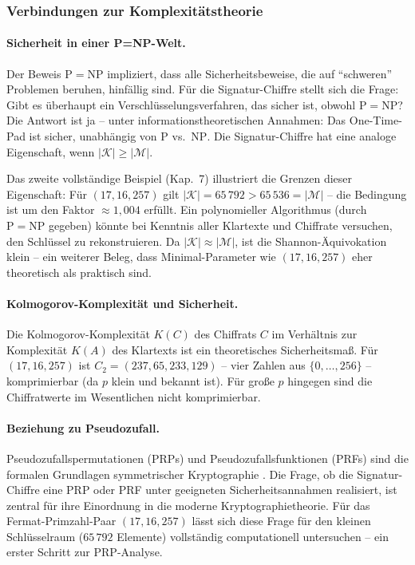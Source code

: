 ﻿\documentclass[a4paper,12pt]{scrreprt}
\theoremstyle{definition}
\begin{document}
\subsubsection{Verbindungen zur Komplexitätstheorie}

\paragraph{Sicherheit in einer P=NP-Welt.}
Der Beweis $\mathrm{P}=\mathrm{NP}$ \cite{Epp26a} impliziert, dass alle Sicherheitsbeweise, die auf ``schweren'' Problemen beruhen, hinfällig sind. Für die Signatur-Chiffre stellt sich die Frage: Gibt es überhaupt ein Verschlüsselungsverfahren, das sicher ist, obwohl $\mathrm{P}=\mathrm{NP}$? Die Antwort ist ja -- unter informationstheoretischen Annahmen: Das One-Time-Pad \cite{Ver26} ist sicher, unabhängig von $\mathrm{P}$ vs.\ $\mathrm{NP}$. Die Signatur-Chiffre hat eine analoge Eigenschaft, wenn $|\mathcal{K}| \geq |\mathcal{M}|$.

Das zweite vollständige Beispiel (Kap.~7) illustriert die Grenzen dieser Eigenschaft: Für $(17, 16, 257)$ gilt $|\mathcal{K}| = 65\,792 > 65\,536 = |\mathcal{M}|$ -- die Bedingung ist um den Faktor $\approx 1{,}004$ erfüllt. Ein polynomieller Algorithmus (durch $\mathrm{P}=\mathrm{NP}$ gegeben) könnte bei Kenntnis aller Klartexte und Chiffrate versuchen, den Schlüssel zu rekonstruieren. Da $|\mathcal{K}| \approx |\mathcal{M}|$, ist die Shannon-Äquivokation klein -- ein weiterer Beleg, dass Minimal-Parameter wie $(17, 16, 257)$ eher theoretisch als praktisch sind.

\paragraph{Kolmogorov-Komplexität und Sicherheit.}
Die Kolmogorov-Komplexität $K(C)$ des Chiffrats $C$ im Verhältnis zur Komplexität $K(A)$ des Klartexts ist ein theoretisches Sicherheitsmaß. Für $(17, 16, 257)$ ist $C_2 = (237, 65, 233, 129)$ -- vier Zahlen aus $\{0,\ldots,256\}$ -- komprimierbar (da $p$ klein und bekannt ist). Für große $p$ hingegen sind die Chiffratwerte im Wesentlichen nicht komprimierbar.

\paragraph{Beziehung zu Pseudozufall.}
Pseudozufallspermutationen (PRPs) und Pseudozufallsfunktionen (PRFs) sind die formalen Grundlagen symmetrischer Kryptographie \cite{GM84}. Die Frage, ob die Signatur-Chiffre eine PRP oder PRF unter geeigneten Sicherheitsannahmen realisiert, ist zentral für ihre Einordnung in die moderne Kryptographietheorie. Für das Fermat-Primzahl-Paar $(17, 16, 257)$ lässt sich diese Frage für den kleinen Schlüsselraum ($65\,792$ Elemente) vollständig computationell untersuchen -- ein erster Schritt zur PRP-Analyse.
\end{document}
